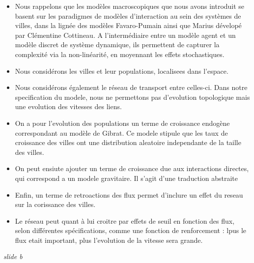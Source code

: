 \documentclass[12pt]{article}
\begin{document}
\begin{itemize}
	\item Nous rappelons que les modèles macroscopiques que nous avons introduit se basent sur les paradigmes de modèles d'interaction au sein des systèmes de villes, dans la lignée des modèles Favaro-Pumain ainsi que Marius dévelopé par Clémentine Cottineau. A l'intermédiaire entre un modèle agent et un modèle discret de système dynamique, ils permettent de capturer la complexité via la non-linéarité, en moyennant les effets stochastiques.
	\item Nous considérons les villes et leur populations, localisees dans l'espace.
	\item Nous considérons également le réseau de transport entre celles-ci. Dans notre specification du modele, nous ne permettons pas d'evolution topologique mais une evolution des vitesses des liens. 
	\item On a pour l'evolution des populations un terme de croissance endogène correspondant au modèle de Gibrat. Ce modele stipule que les taux de croissance des villes ont une distribution aleatoire independante de la taille des villes.
	\item On peut ensiute ajouter un terme de croissance due aux interactions directes, qui correspond a un modele gravitaire. Il s'agit d'une traduction abstraite
	\item Enfin, un terme de retroactions des flux permet d'inclure un effet du reseau sur la corissance des villes.
	\item Le réseau peut quant à lui croitre par effets de seuil en fonction des flux, selon différentes spécifications, comme une fonction de renforcement : lpus le flux etait important, plus l'evolution de la vitesse sera grande.
\end{itemize}


\newpage

\textit{slide b}
	
\end{document}
